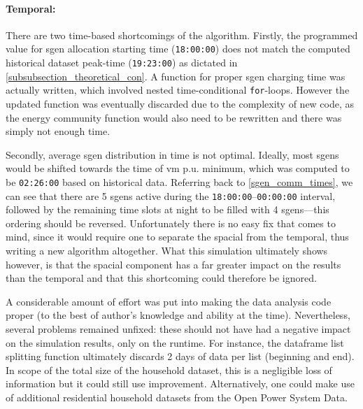 \documentclass[a4paper,10pt]{report}
\begin{document}
\paragraph{Temporal:} There are two time-based shortcomings of the algorithm. Firstly, the programmed value for sgen allocation starting time (\texttt{18:00:00}) does not match the computed historical dataset peak-time (\texttt{19:23:00}) as dictated in \cref{subsubsection_theoretical_con}. A function for proper sgen charging time was actually written, which involved nested time-conditional \texttt{for}-loops. However the updated function was eventually discarded due to the complexity of new code, as the energy community function would also need to be rewritten and there was simply not enough time.

Secondly, average sgen distribution in time is not optimal. Ideally, most sgens would be shifted towards the time of vm p.u. minimum, which was computed to be \texttt{02:26:00} based on historical data. Referring back to \cref{sgen_comm_times}, we can see that there are 5 sgens active during the \texttt{18:00:00}--\texttt{00:00:00} interval, followed by the remaining time slots at night to be filled with 4 sgens---this ordering should be reversed. Unfortunately there is no easy fix that comes to mind, since it would require one to separate the spacial from the temporal, thus writing a new algorithm altogether. What this simulation ultimately shows however, is that the spacial component has a far greater impact on the results than the temporal and that this shortcoming could therefore be ignored.

A considerable amount of effort was put into making the data analysis code proper (to the best of author's knowledge and ability at the time). Nevertheless, several problems remained unfixed: these should not have had a negative impact on the simulation results, only on the runtime. For instance, the dataframe list splitting function ultimately discards 2 days of data per list (beginning and end). In scope of the total size of the household dataset, this is a negligible loss of information but it could still use improvement. Alternatively, one could make use of additional residential household datasets from the Open Power System Data.
\end{document}
